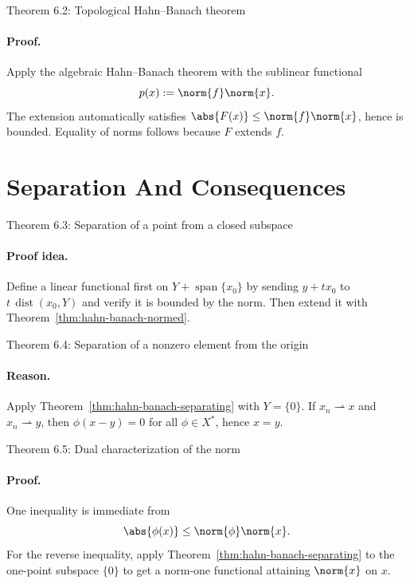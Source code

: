 \documentclass[11pt]{article}
\begin{document}
\begin{thmbox}{Theorem 6.2: Topological Hahn--Banach theorem}
\thmHahnBanachNormed
\end{thmbox}

\paragraph{Proof.}
Apply the algebraic Hahn--Banach theorem with the sublinear functional
\[
p(x):=\norm{f}\norm{x}.
\]
The extension automatically satisfies $\abs{F(x)}\le \norm{f}\norm{x}$, hence is bounded. Equality of norms follows because $F$ extends $f$.

\section{Separation And Consequences}

\begin{thmbox}{Theorem 6.3: Separation of a point from a closed subspace}
\thmHahnBanachSeparating
\end{thmbox}

\paragraph{Proof idea.}
Define a linear functional first on $Y+\operatorname{span}\{x_0\}$ by sending $y+tx_0$ to $t\,\operatorname{dist}(x_0,Y)$ and verify it is bounded by the norm. Then extend it with Theorem~\ref{thm:hahn-banach-normed}.

\begin{thmbox}{Theorem 6.4: Separation of a nonzero element from the origin}
\thmDualSeparates
\end{thmbox}

\paragraph{Reason.}
Apply Theorem~\ref{thm:hahn-banach-separating} with $Y=\{0\}$. If $x_n\rightharpoonup x$ and $x_n\rightharpoonup y$, then $\phi(x-y)=0$ for all $\phi\in X^*$, hence $x=y$.

\begin{thmbox}{Theorem 6.5: Dual characterization of the norm}
\thmNormViaDual
\end{thmbox}

\paragraph{Proof.}
One inequality is immediate from
\[
\abs{\phi(x)}\le \norm{\phi}\norm{x}.
\]
For the reverse inequality, apply Theorem~\ref{thm:hahn-banach-separating} to the one-point subspace $\{0\}$ to get a norm-one functional attaining $\norm{x}$ on $x$.
\end{document}
